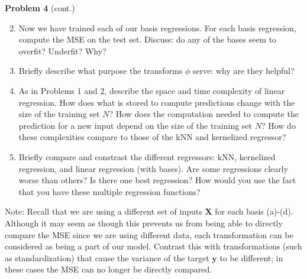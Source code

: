 \documentclass[submit]{harvardml}
\begin{document}
\newpage
\begin{framed}
\noindent\textbf{Problem 4} (cont.)\\
\begin{enumerate}
\setcounter{enumi}{1}
\item 
Now we have trained each of our basis regressions.  For each basis
regression, compute the MSE on the test set.  Discuss: do any of the
bases seem to overfit?  Underfit?  Why?



\item Briefly describe what purpose the transforms $\phi$ serve: why are they helpful?

\item As in Problems 1 and 2, describe the space and time complexity of linear regression.  How does what is stored to compute predictions change with the size of the training set $N$?  How does the computation needed to compute the prediction for a new input depend on the size of the training set $N$?  How do these complexities compare to those of the kNN and kernelized regressor?

\item Briefly compare and constrast the different regressors: kNN,
  kernelized regression, and linear regression (with bases).  Are some
  regressions clearly worse than others?  Is there one best
  regression?  How would you use the fact that you have these multiple
  regression functions?
  
\end{enumerate}
Note:
Recall that we are using a 
different set of inputs $\mathbf{X}$ for each basis (a)-(d). 
Although it may seem as though this prevents us from being able 
to directly compare the MSE since we are using different data, 
each transformation can be considered as being a part of our model. 
Contrast this with transformations (such as standardization) that cause the variance of the target $\mathbf{y}$ to be different; in these cases the
MSE can no longer be directly compared.

\end{framed}
\end{document}
